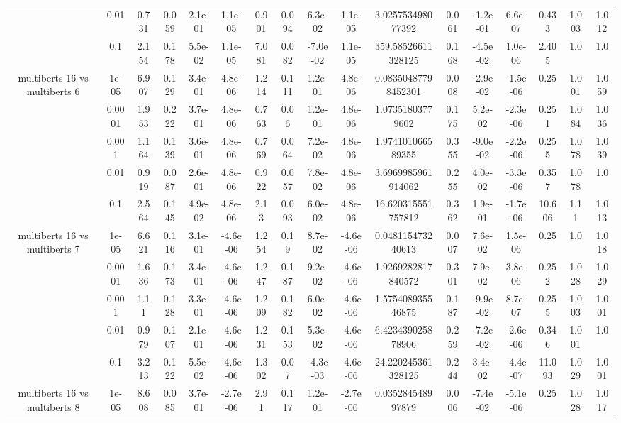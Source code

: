 \begin{tabular}{|c|c|c|c|c|c|c|c|c|c|c|c|c|c|c|c|c|}
 & 0.01 & 0.731 & 0.059 & 2.1e-01 & 1.1e-05 & 0.901 & 0.094 & 6.3e-02 & 1.1e-05 & 3.025753498077392 & 0.061 & -1.2e-01 & 6.6e-07 & 0.433 & 1.003 & 1.012 \\
 & 0.1 & 2.154 & 0.178 & 5.5e-02 & 1.1e-05 & 7.081 & 0.082 & -7.0e-02 & 1.1e-05 & 359.58526611328125 & 0.168 & -4.5e-02 & 1.0e-06 & 2.405 & 1.0 & 1.0 \\
\hline
\multirow{5}{*}{multiberts 16 vs multiberts 6} & 1e-05 & 6.907 & 0.129 & 3.4e-01 & 4.8e-06 & 1.214 & 0.111 & 1.2e-01 & 4.8e-06 & 0.08350487798452301 & 0.008 & -2.9e-02 & -1.5e-06 & 0.25 & 1.001 & 1.059 \\
 & 0.0001 & 1.953 & 0.222 & 3.7e-01 & 4.8e-06 & 0.763 & 0.06 & 1.2e-01 & 4.8e-06 & 1.07351803779602 & 0.175 & 5.2e-02 & -2.3e-06 & 0.251 & 1.084 & 1.036 \\
 & 0.001 & 1.164 & 0.139 & 3.6e-01 & 4.8e-06 & 0.769 & 0.064 & 7.2e-02 & 4.8e-06 & 1.974101066589355 & 0.355 & -9.0e-02 & -2.2e-06 & 0.255 & 1.078 & 1.039 \\
 & 0.01 & 0.919 & 0.087 & 2.6e-01 & 4.8e-06 & 0.922 & 0.057 & 7.8e-02 & 4.8e-06 & 3.6969985961914062 & 0.255 & 4.0e-02 & -3.3e-06 & 0.357 & 1.078 & 1.0 \\
 & 0.1 & 2.564 & 0.145 & 4.9e-02 & 4.8e-06 & 2.13 & 0.093 & 6.0e-02 & 4.8e-06 & 16.620315551757812 & 0.362 & 1.9e-01 & -1.7e-06 & 10.606 & 1.11 & 1.013 \\
\hline
\multirow{5}{*}{multiberts 16 vs multiberts 7} & 1e-05 & 6.621 & 0.116 & 3.1e-01 & -4.6e-06 & 1.254 & 0.19 & 8.7e-02 & -4.6e-06 & 0.048115473240613 & 0.007 & 7.6e-02 & 1.5e-06 & 0.25 & 1.0 & 1.018 \\
 & 0.0001 & 1.636 & 0.173 & 3.4e-01 & -4.6e-06 & 1.247 & 0.187 & 9.2e-02 & -4.6e-06 & 1.9269282817840572 & 0.301 & 7.9e-02 & 3.8e-06 & 0.252 & 1.028 & 1.029 \\
 & 0.001 & 1.11 & 0.128 & 3.3e-01 & -4.6e-06 & 1.209 & 0.182 & 6.0e-02 & -4.6e-06 & 1.575408935546875 & 0.187 & -9.9e-02 & 8.7e-07 & 0.255 & 1.003 & 1.001 \\
 & 0.01 & 0.979 & 0.107 & 2.1e-01 & -4.6e-06 & 1.231 & 0.153 & 5.3e-02 & -4.6e-06 & 6.423439025878906 & 0.259 & -7.2e-02 & -2.6e-06 & 0.346 & 1.001 & 1.0 \\
 & 0.1 & 3.213 & 0.122 & 5.5e-02 & -4.6e-06 & 1.302 & 0.07 & -4.3e-03 & -4.6e-06 & 24.220245361328125 & 0.244 & 3.4e-02 & -4.4e-07 & 11.093 & 1.029 & 1.001 \\
\hline
\multirow{5}{*}{multiberts 16 vs multiberts 8} & 1e-05 & 8.608 & 0.085 & 3.7e-01 & -2.7e-06 & 2.91 & 0.117 & 1.2e-01 & -2.7e-06 & 0.035284548997879 & 0.006 & -7.4e-02 & -5.1e-06 & 0.25 & 1.028 & 1.017 \\

\end{tabular}
